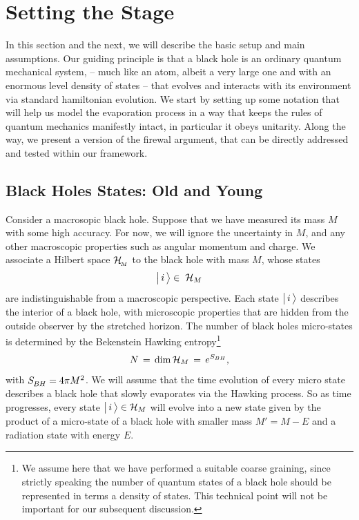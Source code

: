 \documentclass[12pt]{article}%
\def\be{\begin{equation}}
\def\ee{\end{equation}}
\begin{document}
\section{Setting the Stage}
\vspace{-2mm}

In this section and the next, we will describe the basic setup and main assumptions. Our guiding principle is that a black hole is an ordinary quantum mechanical system, 
-- much like an atom, albeit a very large one and with an enormous level density of states -- that evolves and interacts with its environment via standard hamiltonian evolution.  We start by setting up some notation that will 
help us model the evaporation process in a way that keeps the rules of quantum mechanics manifestly intact, in particular it obeys unitarity. Along the way, we present a version of the firewal argument, that can be directly addressed and tested within our framework.

\subsection{Black Holes States: Old and Young}

Consider a macrosopic black hole.
Suppose that we have measured its mass $M$ with some high accuracy.  For now, we will ignore the uncertainty in $M$, and any
other macroscopic properties such as angular momentum and charge.
We associate a Hilbert space ${\cal H}_{{}_{\! M}}$ to the black hole with mass $M$, whose states
\be
\bigl|\,\iii\,\bigr\rangle\in\; {\cal H}_M
\ee
are indistinguishable from a macroscopic perspective. Each state $\bigl| \, i \, \bigr\rangle$ describes the interior of a black hole, with microscopic properties that are hidden from the outside observer by the stretched horizon. The number of black holes micro-states is determined by the Bekenstein Hawking entropy\footnote{We assume here that we have performed a suitable coarse graining, since strictly speaking the number of quantum states of a black hole should be represented in terms a density of states. This technical point will not be important for our subsequent discussion.} 
\be
N \, = \, {\rm dim}\, {\cal H}_M \, =\,  e^{S_{BH}},
\ee
with $S_\BH = 4\pi M^2$. 
We will assume that the time evolution of every micro state describes a black hole that slowly evaporates via the Hawking process. So as time progresses, every state $\bigll|\, i\,\bigrr\rangle \in {\cal H}_M$ will evolve into a new state  given by the product of a micro-state of a black hole with smaller mass $M' = M-E$ and a radiation state with energy $E$.  
\end{document}
